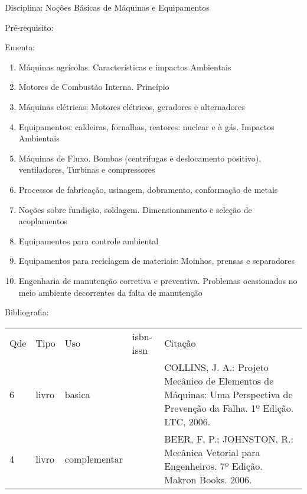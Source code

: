 \documentclass[12pt,a4paper,twoside]{report}
\begin{document}
Disciplina: Noções Básicas de Máquinas e Equipamentos

Pré-requisito:
\begin{enumerate}
\end{enumerate}

Ementa:
\begin{enumerate}
\item Máquinas agrícolas. Características e impactos Ambientais
\item Motores de Combustão Interna. Princípio
\item Máquinas elétricas: Motores elétricos, geradores e alternadores
\item Equipamentos: caldeiras, fornalhas, reatores: nuclear e à gás. Impactos Ambientais
\item Máquinas de Fluxo. Bombas (centrifugas e deslocamento positivo), ventiladores, Turbinas e compressores
\item Processos de fabricação, usinagem, dobramento, conformação de metais
\item Noções sobre fundição, soldagem. Dimensionamento e seleção de acoplamentos
\item Equipamentos para controle ambiental
\item Equipamentos para reciclagem de materiais: Moinhos, prensas e separadores
\item Engenharia de manutenção corretiva e preventiva. Problemas ocasionados no meio ambiente decorrentes da falta de manutenção
\end{enumerate}

Bibliografia:
\begin{tabular}{lllll}
Qde & Tipo & Uso & isbn-issn & Citação \\
6&livro&basica&&COLLINS, J. A.: Projeto Mecânico de Elementos de Máquinas: Uma Perspectiva de Prevenção da Falha. 1º Edição. LTC, 2006.\\
4&livro&complementar&&BEER, F, P.; JOHNSTON, R.: Mecânica Vetorial para Engenheiros. 7º Edição. Makron Books. 2006.\\
\end{tabular}
\end{document}

